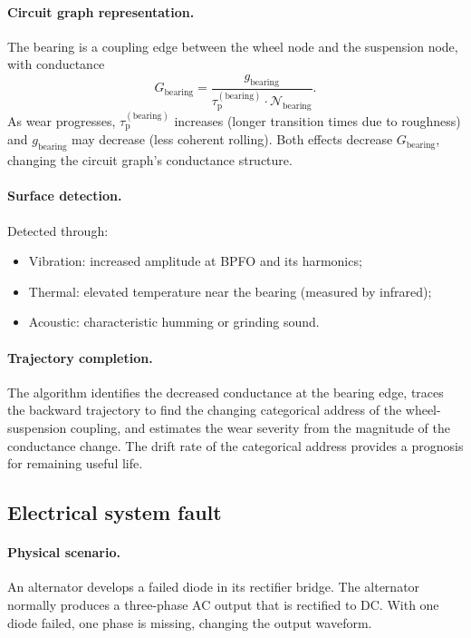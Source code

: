 \documentclass[twocolumn,10pt,a4paper]{article}
\theoremstyle{definition}
\theoremstyle{remark}
\newcommand{\tauP}{\tau_{\mathrm{p}}}
\begin{document}
\paragraph{Circuit graph representation.} The bearing is a coupling edge between the wheel node and the suspension node, with conductance
\begin{equation}
G_{\mathrm{bearing}} = \frac{g_{\mathrm{bearing}}}{\tauP^{(\mathrm{bearing})} \cdot \mathcal{N}_{\mathrm{bearing}}}.
\end{equation}
As wear progresses, $\tauP^{(\mathrm{bearing})}$ increases (longer transition times due to roughness) and $g_{\mathrm{bearing}}$ may decrease (less coherent rolling). Both effects decrease $G_{\mathrm{bearing}}$, changing the circuit graph's conductance structure.

\paragraph{Surface detection.} Detected through:
\begin{itemize}
\item Vibration: increased amplitude at BPFO and its harmonics;
\item Thermal: elevated temperature near the bearing (measured by infrared);
\item Acoustic: characteristic humming or grinding sound.
\end{itemize}

\paragraph{Trajectory completion.} The algorithm identifies the decreased conductance at the bearing edge, traces the backward trajectory to find the changing categorical address of the wheel-suspension coupling, and estimates the wear severity from the magnitude of the conductance change. The drift rate of the categorical address provides a prognosis for remaining useful life.

\subsection{Electrical system fault}\label{sec:electrical}

\paragraph{Physical scenario.} An alternator develops a failed diode in its rectifier bridge. The alternator normally produces a three-phase AC output that is rectified to DC. With one diode failed, one phase is missing, changing the output waveform.
\end{document}
